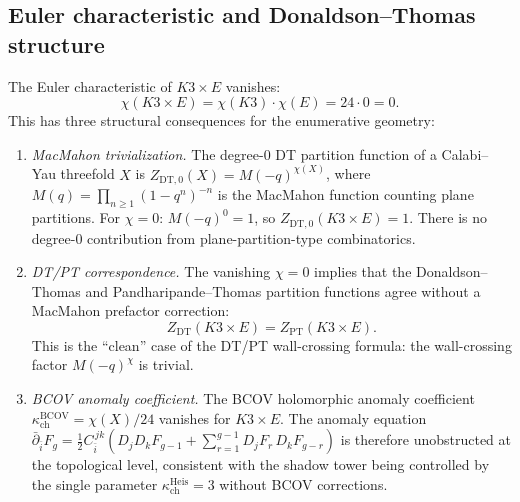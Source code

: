 \subsection{Euler characteristic and Donaldson--Thomas structure}
\label{subsec:euler-dt}

\begin{proposition}[\texorpdfstring{$\chi(K3 \times E) = 0$}{chi(K3 x E) = 0} and its consequences;
]
\label{prop:chi-zero}
The Euler characteristic of $K3 \times E$ vanishes:
\[
\chi(K3 \times E) = \chi(K3) \cdot \chi(E)
= 24 \cdot 0 = 0.
\]
This has three structural consequences for the
enumerative geometry:
\begin{enumerate}[label=\textup{(\roman*)}]
\item \emph{MacMahon trivialization.}
The degree-$0$ DT partition function of a Calabi--Yau
threefold $X$ is $Z_{\mathrm{DT},0}(X) = M(-q)^{\chi(X)}$,
where $M(q) = \prod_{n \geq 1}(1-q^n)^{-n}$ is the
MacMahon function counting plane partitions. For
$\chi = 0$: $M(-q)^0 = 1$, so
$Z_{\mathrm{DT},0}(K3 \times E) = 1$. There is no
degree-$0$ contribution from plane-partition-type
combinatorics.
\item \emph{DT/PT correspondence.}
The vanishing $\chi = 0$ implies that the
Donaldson--Thomas and Pandharipande--Thomas partition
functions agree without a MacMahon prefactor correction:
\[
Z_{\mathrm{DT}}(K3 \times E)
= Z_{\mathrm{PT}}(K3 \times E).
\]
This is the ``clean'' case of the DT/PT wall-crossing
formula: the wall-crossing factor $M(-q)^{\chi}$ is trivial.
\item \emph{BCOV anomaly coefficient.}
The BCOV holomorphic anomaly coefficient
$\kappa_{\mathrm{ch}}^{\mathrm{BCOV}}=\chi(X)/24$ vanishes for
$K3 \times E$. The anomaly equation
$\bar{\partial}_{\bar{i}} F_g = \frac{1}{2}
C_{\bar{i}}^{\,jk}(D_j D_k F_{g-1} + \sum_{r=1}^{g-1}
D_j F_r\,D_k F_{g-r})$ is
therefore unobstructed at the topological level,
consistent with the shadow tower being controlled by the
single parameter $\kappa_{\mathrm{ch}}^{\mathrm{Heis}} = 3$ without BCOV corrections.
\end{enumerate}
\end{proposition}

